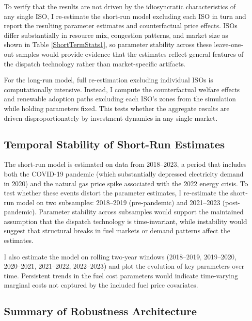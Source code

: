 \documentclass[12pt]{article}
\begin{document}
To verify that the results are not driven by the idiosyncratic characteristics of any single ISO, I re-estimate the short-run model excluding each ISO in turn and report the resulting parameter estimates and counterfactual price effects. ISOs differ substantially in resource mix, congestion patterns, and market size as shown in Table \ref{ShortTermStats1}, so parameter stability across these leave-one-out samples would provide evidence that the estimates reflect general features of the dispatch technology rather than market-specific artifacts.

For the long-run model, full re-estimation excluding individual ISOs is computationally intensive. Instead, I compute the counterfactual welfare effects and renewable adoption paths excluding each ISO's zones from the simulation while holding parameters fixed. This tests whether the aggregate results are driven disproportionately by investment dynamics in any single market.


\subsection{Temporal Stability of Short-Run Estimates}\label{app:robustness:temporal}

The short-run model is estimated on data from 2018--2023, a period that includes both the COVID-19 pandemic (which substantially depressed electricity demand in 2020) and the natural gas price spike associated with the 2022 energy crisis. To test whether these events distort the parameter estimates, I re-estimate the short-run model on two subsamples: 2018--2019 (pre-pandemic) and 2021--2023 (post-pandemic). Parameter stability across subsamples would support the maintained assumption that the dispatch technology is time-invariant, while instability would suggest that structural breaks in fuel markets or demand patterns affect the estimates.

I also estimate the model on rolling two-year windows (2018--2019, 2019--2020, 2020--2021, 2021--2022, 2022--2023) and plot the evolution of key parameters over time. Persistent trends in the fuel cost parameters would indicate time-varying marginal costs not captured by the included fuel price covariates.


\subsection{Summary of Robustness Architecture}\label{app:robustness:summary}
\end{document}
